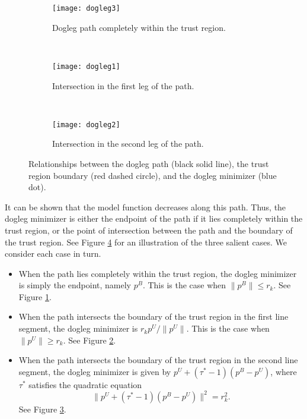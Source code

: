 \begin{figure}
\centering
    \begin{subfigure}[b]{0.3\textwidth}
            \texttt{[image: dogleg3]}
            \caption{Dogleg path completely within the trust region.}
            \label{fig:dl3}
    \end{subfigure}%
    ~ %
    \begin{subfigure}[b]{0.3\textwidth}
            \texttt{[image: dogleg1]}
            \caption{Intersection in the first leg of the path.}
            \label{fig:dl1}
    \end{subfigure}
    ~ %
    \begin{subfigure}[b]{0.3\textwidth}
            \texttt{[image: dogleg2]}
            \caption{Intersection in the second leg of the path.}
            \label{fig:dl2}
    \end{subfigure}
    \caption{Relationships between the dogleg path (black solid line),
    the trust region boundary (red dashed circle), and the dogleg minimizer (blue dot).}
    \label{fig:dogleg}
\end{figure}

It can be shown that the model function decreases along this path. Thus,
the dogleg minimizer is either the endpoint of the path if it lies completely within the trust region,
or the point of intersection between the path and the boundary of the trust region.
See Figure \ref{fig:dogleg} for an illustration of the three salient cases. We consider each case in turn.
\begin{itemize}
\item
When the path lies completely within the trust region, the dogleg minimizer is simply the endpoint, namely $p^B$.
This is the case when $\|p^B\| \leq r_k$. See Figure \ref{fig:dl3}.
\item
When the path intersects the boundary of the trust region in the first line segment, the dogleg minimizer is
$r_kp^U/\|p^U\|$.
This is the case when $\|p^U\| \geq r_k$. See Figure \ref{fig:dl1}.
\item
When the path intersects the boundary of the trust region in the second line segment, the dogleg minimizer is
given by $p^U + (\tau^*-1)(p^B-p^U)$, where $\tau^*$ satisfies the quadratic equation
\[
\|p^U + (\tau^*-1)(p^B-p^U)\|^2 = r_k^2.
\]
See Figure \ref{fig:dl2}.
\end{itemize}

